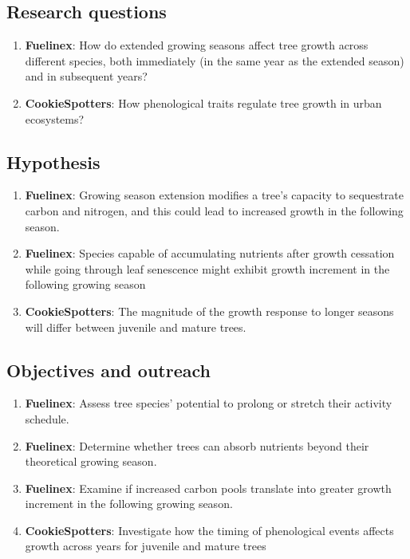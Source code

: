 \documentclass{article}
\begin{document}
\subsection {Research questions}
\begin {enumerate}
	\item \textbf{Fuelinex}: How do extended growing seasons affect tree growth across different species, both immediately (in the same year as the extended season) and in subsequent years?
	\item \textbf {CookieSpotters}: How phenological traits regulate tree growth in urban ecosystems?
\end {enumerate}

\subsection{Hypothesis}
\begin {enumerate}
	\item \textbf{Fuelinex}: Growing season extension modifies a tree’s capacity to sequestrate carbon and nitrogen, and this could lead to increased growth in the following season.
	\item \textbf{Fuelinex}: Species capable of accumulating nutrients after growth cessation while going through leaf senescence might exhibit growth increment in the following growing season
	\item \textbf{CookieSpotters}: The magnitude of the growth response to longer seasons will differ between juvenile and mature trees.
\end {enumerate}

\subsection{Objectives and outreach}
\begin {enumerate}
	\item \textbf{Fuelinex}: Assess tree species’ potential to prolong or stretch their activity schedule.
	\item \textbf{Fuelinex}:  Determine whether trees can absorb nutrients beyond their theoretical growing season.
	\item \textbf{Fuelinex}:  Examine if increased carbon pools translate into greater growth increment in the following growing season. 
	\item \textbf{CookieSpotters}: Investigate how the timing of phenological events affects growth across years for juvenile and mature trees
\end {enumerate}
\end{document}
